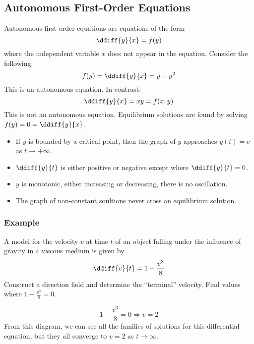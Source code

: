 \documentclass{math}
\begin{document}
\subsection*{Autonomous First-Order Equations}
Autonomous first-order equations are equations of the form
\[ \ddiff{y}{x} = f(y) \]
where the independent variable \( x \) does not appear in the equation.
Consider the following:
\[ f(y) = \ddiff{y}{x} = y-y^2 \]
This is an autonomous equation. In contrast:
\[ \ddiff{y}{x} = xy = f(x,y) \]
This is not an autonomous equation. Equilibrium solutions are found by solving
\( f(y) = 0 = \ddiff{y}{x} \).
\begin{itemize}
  \item If \( y \) is bounded by a critical point, then the graph of \( y \)
  approaches \( y(t) = c \) as \( t\to+\infty \).
  \item \( \ddiff{y}{t} \) is either positive or negative except where
  \( \ddiff{y}{t} = 0 \).
  \item \( y \) is monotonic, either increasing or decreasing, there is no
  oscillation.
  \item The graph of non-constant soultions never cross an equilibrium solution.
\end{itemize}

\subsubsection*{Example}
A model for the velocity \( v \) at time \( t \) of an object falling under the
influence of gravity in a viscous medium is given by
\[ \ddiff{v}{t} = 1-\frac{v^3}{8} \]
Construct a direction field and determine the ``terminal'' velocity. Find values
where \( 1-\frac{v^3}{8} = 0 \).
\begin{center}
\end{center}
\[ 1-\frac{v^3}{8} = 0 \Rightarrow v = 2 \]
From this diagram, we can see all the families of solutions for this
differential equation, but they all converge to \( v = 2 \) as \( t\to\infty \).
\end{document}
